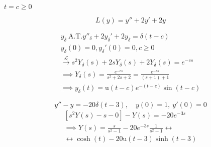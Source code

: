\documentclass[11pt,a4paper,titlepage,final]{article}
\begin{document}
\begin{exercise*}{13.5}
	\( t = c\geq0 \)


	\[
	L(y) = y''+2y'+2y
	\]
	
	\begin{gather*}
	y_\delta \ \text{Α.Τ.} y''_\delta + 2y_\delta' + 2y_\delta = \delta(t-c)
	\\ y_\delta(0) = 0, y_\delta'(0) = 0, c \geq 0 \\
	\xrightarrow{\mathscr L}
	s^2Y_\delta(s)+2sY_\delta(s)+2Y_\delta(s) = e^{-cs}
	\\ \implies Y_\delta(s) = \frac{e^{-cs}}{s^2+2s+2} = \frac{e^{-cs}}{(s+1)+1}
	\\ \implies \boxed{
		y_\delta(t) = \mathrm u(t-c)e^{-(t-c)}\sin (t-c)
		}
	\end{gather*}
\end{exercise*}


\begin{exercise*}{13.6}
	\[
	y''-y=-20\delta(t-3), \quad y(0) = 1,\ y'(0) = 0
	\]
	\tcblower
	\begin{gather*}
	\left[s^2Y(s)-s-0\right]-Y(s)=-20e^{-3s} \\
	\implies Y(s) = \frac{s}{s^2-1}-20e^{-3s}\frac{1}{s^2-1} \leftrightarrow \\
	\leftrightarrow \cosh(t)-20\mathrm u(t-3)\sinh(t-3)
	\end{gather*}
\end{exercise*}
\end{document}
